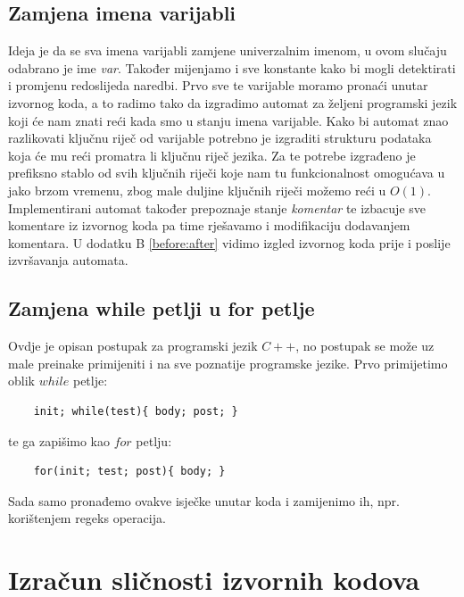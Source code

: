 \subsection{Zamjena imena varijabli}

Ideja je da se sva imena varijabli zamjene univerzalnim imenom, u ovom slučaju odabrano je ime \textit{var}. Također mijenjamo i sve konstante kako bi mogli detektirati i promjenu redoslijeda naredbi. Prvo sve te varijable moramo pronaći unutar izvornog koda, a to radimo tako da izgradimo automat za željeni programski jezik koji će nam znati reći kada smo u stanju imena varijable. Kako bi automat znao razlikovati ključnu riječ od varijable potrebno je izgraditi strukturu podataka koja će mu reći promatra li ključnu riječ jezika. Za te potrebe izgrađeno je prefiksno stablo \cite{prefix-tree} od svih ključnih riječi koje nam tu funkcionalnost omogućava u jako brzom vremenu, zbog male duljine ključnih riječi možemo reći u $O(1)$. Implementirani automat također prepoznaje stanje \textit{komentar} te izbacuje sve komentare iz izvornog koda pa time rješavamo i modifikaciju dodavanjem komentara. U dodatku B \ref{before:after} vidimo izgled izvornog koda prije i poslije izvršavanja automata. \newline


\subsection{Zamjena while petlji u for petlje}

Ovdje je opisan postupak za programski jezik $C++$, no postupak se može uz male preinake primijeniti i na sve poznatije programske jezike. Prvo primijetimo oblik $while$ petlje:
\begin{lstlisting}
	init; while(test){ body; post; }
\end{lstlisting}

\noindent te ga zapišimo kao $for$ petlju:
\begin{lstlisting}
	for(init; test; post){ body; }
\end{lstlisting}

\noindent Sada samo pronađemo ovakve isječke unutar koda i zamijenimo ih, npr. korištenjem regeks operacija.

\section{Izračun sličnosti izvornih kodova}

